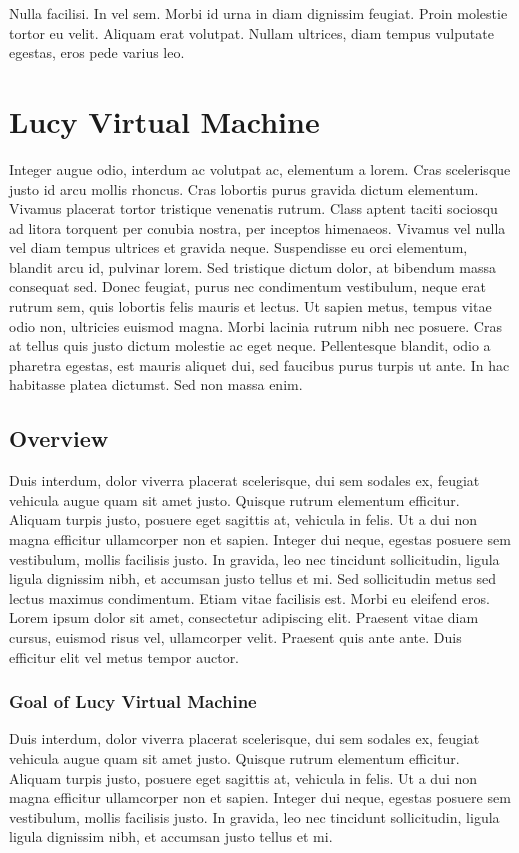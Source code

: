 \begin{savequote}[75mm]
Nulla facilisi. In vel sem. Morbi id urna in diam dignissim feugiat. Proin molestie tortor eu velit. Aliquam erat volutpat. Nullam ultrices, diam tempus vulputate egestas, eros pede varius leo.
\end{savequote}

\chapter{Lucy Virtual Machine}
Integer augue odio, interdum ac volutpat ac, elementum a lorem. Cras scelerisque justo id arcu mollis rhoncus. Cras lobortis purus gravida dictum elementum. Vivamus placerat tortor tristique venenatis rutrum. Class aptent taciti sociosqu ad litora torquent per conubia nostra, per inceptos himenaeos. Vivamus vel nulla vel diam tempus ultrices et gravida neque. Suspendisse eu orci elementum, blandit arcu id, pulvinar lorem. Sed tristique dictum dolor, at bibendum massa consequat sed. Donec feugiat, purus nec condimentum vestibulum, neque erat rutrum sem, quis lobortis felis mauris et lectus. Ut sapien metus, tempus vitae odio non, ultricies euismod magna. Morbi lacinia rutrum nibh nec posuere. Cras at tellus quis justo dictum molestie ac eget neque. Pellentesque blandit, odio a pharetra egestas, est mauris aliquet dui, sed faucibus purus turpis ut ante. In hac habitasse platea dictumst. Sed non massa enim.

\section{Overview}
Duis interdum, dolor viverra placerat scelerisque, dui sem sodales ex, feugiat vehicula augue quam sit amet justo. Quisque rutrum elementum efficitur. Aliquam turpis justo, posuere eget sagittis at, vehicula in felis. Ut a dui non magna efficitur ullamcorper non et sapien. Integer dui neque, egestas posuere sem vestibulum, mollis facilisis justo. In gravida, leo nec tincidunt sollicitudin, ligula ligula dignissim nibh, et accumsan justo tellus et mi. Sed sollicitudin metus sed lectus maximus condimentum. Etiam vitae facilisis est. Morbi eu eleifend eros. Lorem ipsum dolor sit amet, consectetur adipiscing elit. Praesent vitae diam cursus, euismod risus vel, ullamcorper velit. Praesent quis ante ante. Duis efficitur elit vel metus tempor auctor.

\subsection{Goal of Lucy Virtual Machine}
Duis interdum, dolor viverra placerat scelerisque, dui sem sodales ex, feugiat vehicula augue quam sit amet justo. Quisque rutrum elementum efficitur. Aliquam turpis justo, posuere eget sagittis at, vehicula in felis. Ut a dui non magna efficitur ullamcorper non et sapien. Integer dui neque, egestas posuere sem vestibulum, mollis facilisis justo. In gravida, leo nec tincidunt sollicitudin, ligula ligula dignissim nibh, et accumsan justo tellus et mi.

